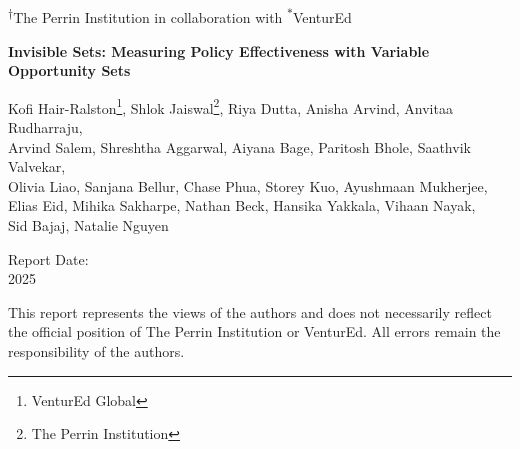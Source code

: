 \documentclass[11pt,letterpaper]{report}
\theoremstyle{definition}
\theoremstyle{remark}
\begin{document}
\begin{titlepage}
\thispagestyle{titlepage}
\begin{center}

\vspace{1cm}

{\large \textsuperscript{$\dag$}{The Perrin Institution} {in collaboration with} \textsuperscript{$\ast$}{VenturEd}}

\vspace{3cm}

{\huge\bfseries Invisible Sets: Measuring Policy Effectiveness with Variable Opportunity Sets}

\vspace{1cm}


\vspace{2cm}

{\large
\renewcommand{\thefootnote}{\fnsymbol{footnote}}
Kofi Hair-Ralston\thanks{VenturEd Global}, Shlok Jaiswal\thanks{The Perrin Institution}, Riya Dutta\footnotemark[2], Anisha Arvind\footnotemark[2], Anvitaa Rudharraju\footnotemark[2],\\
Arvind Salem\footnotemark[2], Shreshtha Aggarwal\footnotemark[2], Aiyana Bage\footnotemark[2], Paritosh Bhole\footnotemark[2], Saathvik Valvekar\footnotemark[2],\\
Olivia Liao\footnotemark[2], Sanjana Bellur\footnotemark[2], Chase Phua\footnotemark[2], Storey Kuo\footnotemark[2], Ayushmaan Mukherjee\footnotemark[2],\\
Elias Eid\footnotemark[2], Mihika Sakharpe\footnotemark[2], Nathan Beck\footnotemark[2], Hansika Yakkala\footnotemark[2], Vihaan Nayak\footnotemark[2],\\
Sid Bajaj\footnotemark[2], Natalie Nguyen\footnotemark[2]
\renewcommand{\thefootnote}{\arabic{footnote}}
}

\vspace{1.5cm}


\vspace{1cm}

{\large Report Date:}\\
{\large 2025}\\
\vspace{0.3cm}

\vfill

{\footnotesize\color{textgray}
This report represents the views of the authors and does not necessarily reflect the official position of The Perrin Institution or VenturEd. All errors remain the responsibility of the authors.
}

\end{center}
\end{titlepage}
\end{document}
